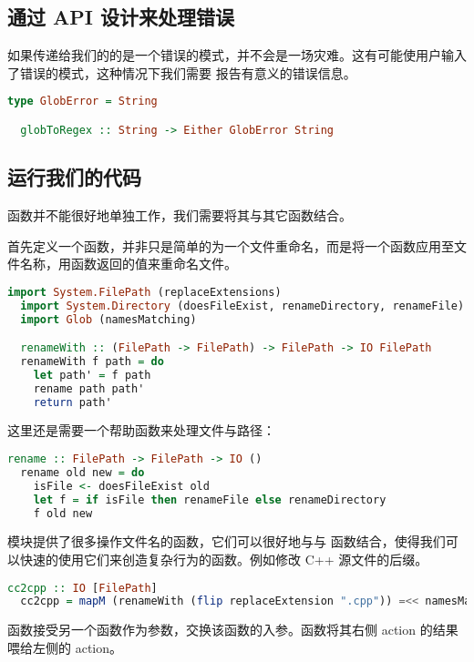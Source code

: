 \documentclass[./main.tex]{subfiles}
\begin{document}
\subsection*{通过 API 设计来处理错误}

如果传递给我们的的是一个错误的模式，并不会是一场灾难。这有可能使用户输入了错误的模式，这种情况下我们需要
报告有意义的错误信息。

\begin{lstlisting}[language=Haskell]
  type GlobError = String

  globToRegex :: String -> Either GlobError String
\end{lstlisting}

\subsection*{运行我们的代码}

函数并不能很好地单独工作，我们需要将其与其它函数结合。

首先定义一个函数，并非只是简单的为一个文件重命名，而是将一个函数应用至文件名称，用函数返回的值来重命名文件。

\begin{lstlisting}[language=Haskell]
  import System.FilePath (replaceExtensions)
  import System.Directory (doesFileExist, renameDirectory, renameFile)
  import Glob (namesMatching)

  renameWith :: (FilePath -> FilePath) -> FilePath -> IO FilePath
  renameWith f path = do
    let path' = f path
    rename path path'
    return path'
\end{lstlisting}

这里还是需要一个帮助函数来处理文件与路径：

\begin{lstlisting}[language=Haskell]
  rename :: FilePath -> FilePath -> IO ()
  rename old new = do
    isFile <- doesFileExist old
    let f = if isFile then renameFile else renameDirectory
    f old new
\end{lstlisting}

模块提供了很多操作文件名的函数，它们可以很好地与与
函数结合，使得我们可以快速的使用它们来创造复杂行为的函数。例如修改 C++ 源文件的后缀。

\begin{lstlisting}[language=Haskell]
  cc2cpp :: IO [FilePath]
  cc2cpp = mapM (renameWith (flip replaceExtension ".cpp")) =<< namesMatching "*.cc"
\end{lstlisting}

函数接受另一个函数作为参数，交换该函数的入参。\acode{=<<}函数将其右侧 action 的结果喂给左侧的 action。
\end{document}
